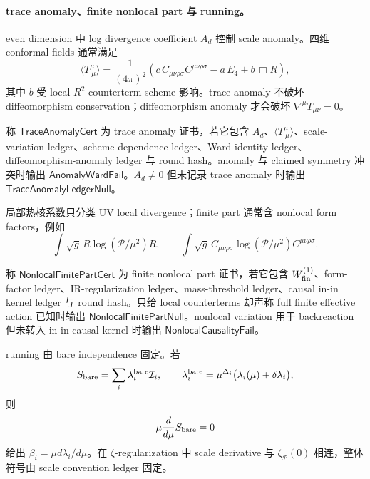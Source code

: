 \paragraph{trace anomaly、finite nonlocal part 与 running。}
even dimension 中 log divergence coefficient \(A_d\) 控制 scale anomaly。四维 conformal fields 通常满足
\[
\langle T^\mu_{\ \mu}\rangle
=
\frac1{(4\pi)^2}
\left(
c\,C_{\mu\nu\rho\sigma}C^{\mu\nu\rho\sigma}
-a\,E_4
+b\,\Box R
\right),
\]
其中 \(b\) 受 local \(R^2\) counterterm scheme 影响。trace anomaly 不破坏 diffeomorphism conservation；diffeomorphism anomaly 才会破坏 \(\nabla^\mu T_{\mu\nu}=0\)。

\begin{definition}\label{def:typed-address-biaxial-completion-heat-kernel-trace-anomaly-cert}
称 \(\mathsf{TraceAnomalyCert}\) 为 trace anomaly 证书，若它包含 \(A_d\)、\(\langle T^\mu_{\ \mu}\rangle\)、scale-variation ledger、scheme-dependence ledger、Ward-identity ledger、diffeomorphism-anomaly ledger 与 round hash。anomaly 与 claimed symmetry 冲突时输出 \(\mathsf{AnomalyWardFail}\)。\(A_d\ne0\) 但未记录 trace anomaly 时输出 \(\mathsf{TraceAnomalyLedgerNull}\)。
\end{definition}

局部热核系数只分类 UV local divergence；finite part 通常含 nonlocal form factors，例如
\[
\int\sqrt g\,R\log(\mathcal P/\mu^2)R,
\qquad
\int\sqrt g\,C_{\mu\nu\rho\sigma}\log(\mathcal P/\mu^2)C^{\mu\nu\rho\sigma}.
\]

\begin{definition}\label{def:typed-address-biaxial-completion-nonlocal-finite-part-cert}
称 \(\mathsf{NonlocalFinitePartCert}\) 为 finite nonlocal part 证书，若它包含 \(W_{\rm fin}^{(1)}\)、form-factor ledger、IR-regularization ledger、mass-threshold ledger、causal in-in kernel ledger 与 round hash。只给 local counterterms 却声称 full finite effective action 已知时输出 \(\mathsf{NonlocalFinitePartNull}\)。nonlocal variation 用于 backreaction 但未转入 in-in causal kernel 时输出 \(\mathsf{NonlocalCausalityFail}\)。
\end{definition}

running 由 bare independence 固定。若
\[
S_{\rm bare}=\sum_i\lambda_i^{\rm bare}\mathcal I_i,
\qquad
\lambda_i^{\rm bare}
=
\mu^{\Delta_i}\bigl(\lambda_i(\mu)+\delta\lambda_i\bigr),
\]
则
\[
\mu\frac{d}{d\mu}S_{\rm bare}=0
\]
给出 \(\beta_i=\mu d\lambda_i/d\mu\)。在 \(\zeta\)-regularization 中 scale derivative 与 \(\zeta_{\mathcal P}(0)\) 相连，整体符号由 scale convention ledger 固定。

